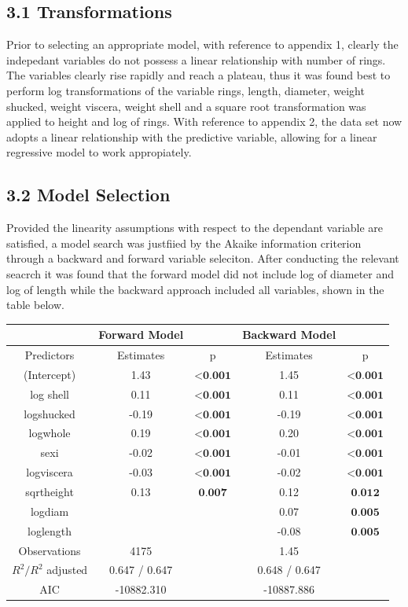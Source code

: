 \documentclass[letterpaper,9pt,twocolumn,twoside,]{pinp}
\begin{document}
\hypertarget{transformations}{%
\subsection{3.1 Transformations}\label{transformations}}

Prior to selecting an appropriate model, with reference to appendix 1,
clearly the indepedant variables do not possess a linear relationship
with number of rings. The variables clearly rise rapidly and reach a
plateau, thus it was found best to perform log transformations of the
variable rings, length, diameter, weight shucked, weight viscera, weight
shell and a square root transformation was applied to height and log of
rings. With reference to appendix 2, the data set now adopts a linear
relationship with the predictive variable, allowing for a linear
regressive model to work appropiately.

\hypertarget{model-selection}{%
\subsection{3.2 Model Selection}\label{model-selection}}

Provided the linearity assumptions with respect to the dependant
variable are satisfied, a model search was justfiied by the Akaike
information criterion through a backward and forward variable seleciton.
After conducting the relevant seacrch it was found that the forward
model did not include log of diameter and log of length while the
backward approach included all variables, shown in the table below.

\begin{center}
\begin{tabular}{c c c c c}
    & Forward Model & & Backward Model & \\
    \hline
    Predictors & Estimates & p & Estimates & p\\
    \hline
    (Intercept) & 1.43 & $\textbf{<0.001}$ & 1.45 & $\textbf{<0.001}$\\
    log shell & 0.11 & $\textbf{<0.001}$ & 0.11 & $\textbf{<0.001}$\\
    logshucked & -0.19 & $\textbf{<0.001}$ & -0.19 & $\textbf{<0.001}$\\
    logwhole & 0.19 & $\textbf{<0.001}$ & 0.20 & $\textbf{<0.001}$\\
    sexi & -0.02 & $\textbf{<0.001}$ & -0.01 & $\textbf{<0.001}$\\
    logviscera & -0.03 & $\textbf{<0.001}$ & -0.02 & $\textbf{<0.001}$\\
    sqrtheight & 0.13 & $\textbf{0.007}$ & 0.12 & $\textbf{0.012}$\\
    logdiam &  & & 0.07 & $\textbf{0.005}$\\
     loglength &  & & -0.08 & $\textbf{0.005}$\\
    \hline
    Observations & 4175 &  & 1.45 & \\
    $R^2/R^2$ adjusted & 0.647 / 0.647 & & 0.648 / 0.647 & \\
    AIC & -10882.310 & & -10887.886 & \\
\end{tabular}
\end{center}
\end{document}
